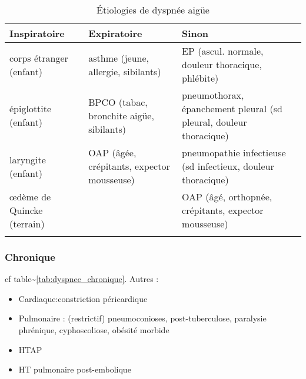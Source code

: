\documentclass[11pt]{article}
\begin{document}
\begin{table}[htbp]
\caption{Étiologies de dyspnée aigüe}
\label{tab:dyspnee_aigue}
\centering
\begin{adjustbox}{max width=\textwidth}
\begin{tabular}{lll}
\toprule
Inspiratoire & Expiratoire & Sinon\\
\midrule
corps étranger (enfant) & asthme (jeune, allergie, sibilants) & EP
                                                                (ascul. normale,
                                                                douleur
                                                                thoracique, phlébite)\\
épiglottite (enfant) & BPCO (tabac, bronchite aigüe, sibilants) & pneumothorax,
                                                                  épanchement
                                                                  pleural (sd
                                                                  pleural,
                                                                  douleur thoracique)\\
laryngite (enfant) & OAP (âgée, crépitants, expector mousseuse) & pneumopathie
                                                                  infectieuse
                                                                  (sd
                                                                  infectieux,
                                                                  douleur thoracique)\\
\oe{}dème de Quincke (terrain)&  & OAP (âgé, orthopnée, crépitants, expector mousseuse)\\
 &  & \\
\bottomrule
\end{tabular}
\end{adjustbox}
\end{table}

\subsubsection{Chronique}
\label{sec:orge9e3394}
cf table\textasciitilde{}\ref{tab:dyspnee_chronique}.
Autres :

\begin{itemize}
\item Cardiaque:constriction péricardique
\item Pulmonaire : (restrictif) pneumoconioses, post-tuberculose, paralysie phrénique, cyphoscoliose, obésité morbide
\item HTAP
\item HT pulmonaire post-embolique
\end{itemize}
\end{document}
